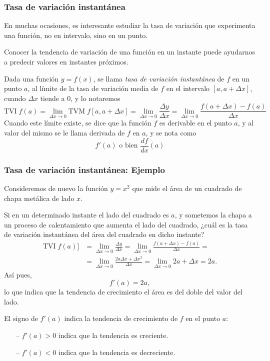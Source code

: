\begin{frame}
\frametitle{Tasa de variación instantánea}
En muchas ocasiones, es interesante estudiar la tasa de variación que experimenta una función, no en intervalo, sino en
un punto.

Conocer la tendencia de variación de una función en un instante puede ayudarnos a predecir valores en instantes
próximos.

\begin{definicion}
Dada una función $y=f(x)$, se llama \emph{tasa de variación instantánea} de $f$ en un punto $a$, al límite de la tasa de
variación media de $f$ en el intervalo $[a,a+\Delta x]$, cuando $\Delta x$ tiende a 0, y lo notaremos
\[
\textrm{TVI}\;f (a)=\lim_{\Delta x\rightarrow 0} \textrm{TVM}\; f[a,a+\Delta x]=\lim_{\Delta x\rightarrow 0}\frac{\Delta y}{\Delta x}=\lim_{\Delta x\rightarrow 0}\frac{f(a+\Delta x)-f(a)}{\Delta x} 
\]
Cuando este límite existe, se dice que la función $f$ es derivable en el punto $a$, y al valor del mismo se le llama
derivada de $f$ en $a$, y se nota como
\[
f'(a) \mbox{ o bien } \frac{df}{dx}(a)
\]
\end{definicion}
\end{frame}


\begin{frame}
\frametitle{Tasa de variación instantánea: Ejemplo}
Consideremos de nuevo la función $y=x^2$ que mide el área de un cuadrado de chapa metálica de lado $x$.

Si en un determinado instante el lado del cuadrado es $a$, y sometemos la chapa a un proceso de calentamiento que
aumenta el lado del cuadrado, ¿cuál es la tasa de variación instantánea del área del cuadrado en dicho instante?
\begin{align*}
\textrm{TVI}\;f(a)]&=\lim_{\Delta x\rightarrow 0}\frac{\Delta y}{\Delta x}=\lim_{\Delta x\rightarrow 0}\frac{f(a+\Delta x)-f(a)}{\Delta x} =\\
&=\lim_{\Delta x\rightarrow 0}\frac{2a\Delta x+\Delta x^2}{\Delta x}=\lim_{\Delta x\rightarrow 0} 2a+\Delta x= 2a. 
\end{align*}
Así pues,
\[
f'(a)=2a,
\]
lo que indica que la tendencia de crecimiento el área es del doble del valor del lado.  

El signo de $f'(a)$ indica la tendencia de crecimiento de $f$ en el punto $a$:
\begin{itemize}
\item[--]  $f'(a)>0$ indica que la tendencia es creciente.
\item[--]  $f'(a)<0$ indica que la tendencia es decreciente.
\end{itemize}
\end{frame}


